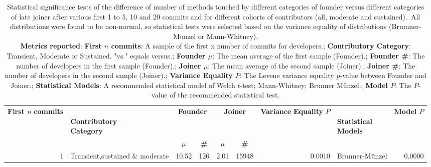 \begin{table}[H]
\centering
\setlength{\tabcolsep}{2pt}
\caption[Statistical Significance Normality and Variance tests for methods for different categories of founder versus different categories of late joiner  for 1 to 5, 10 and 20]{Statistical significance tests of the difference of number of methods touched by different categories of founder versus different categories of late joiner  after various first 1 to 5, 10 and 20 commits and for different cohorts of contributors (all, moderate and sustained). All distributions were found to be non-normal, so statistical tests were selected based on the variance equality of distributions (Brumner-Munzel or Mann-Whitney). \\ \textbf{Metrics reported}:   \textbf{First $n$ commits}: A sample of the first x number of commits for developers.;  \textbf{Contributory Category}: Transient, Moderate or Sustained. "vs." equals versus.;  \textbf{Founder $\mu$}: The mean average of the first sample (Founder).;  \textbf{Founder \#}: The number of developers in the first sample (Founder).;  \textbf{Joiner $\mu$}: The mean average of the second sample (Joiner).;  \textbf{Joiner \#}: The number of developers in the second sample (Joiner).;  \textbf{Variance Equality $P$}: The Levene variance equality $p$-value between Founder and Joiner.;  \textbf{Statistical Models}: A recommended statistical model of Welch $t$-test; Mann-Whitney; Brunner Münzel.;  \textbf{Model $P$}: The $P$-value of the recommended statistical test.
}
\begin{tabular}{r p{4cm} c c c c r l r}
\toprule
\makecell[t]{\textbf{First $n$}\\\textbf{commits}} & \makecell[t]{\textbf{}\\\textbf{Contributory}\\\textbf{Category}} & \multicolumn{2}{c}{\textbf{Founder}} & \multicolumn{2}{c}{\textbf{Joiner}} & \makecell[t]{\textbf{Variance}\\\textbf{Equality}\\\textbf{$P$}} & \makecell[t]{\textbf{}\\\textbf{Statistical}\\\textbf{Models}} & \textbf{Model $P$} \\ 
\cmidrule(lr){3-4} \cmidrule(lr){5-6}
 &  & \textbf{$\mu$} & \textbf{\#} & \textbf{$\mu$} & \textbf{\#} &  &  &  \\ 
\midrule
1 & Transient,sustained \& moderate &  10.52 & 126 & 2.01 & 15948 & 0.0010 &  Brunner-Münzel & 0.0000 \\ 

\end{tabular}
\end{table}
